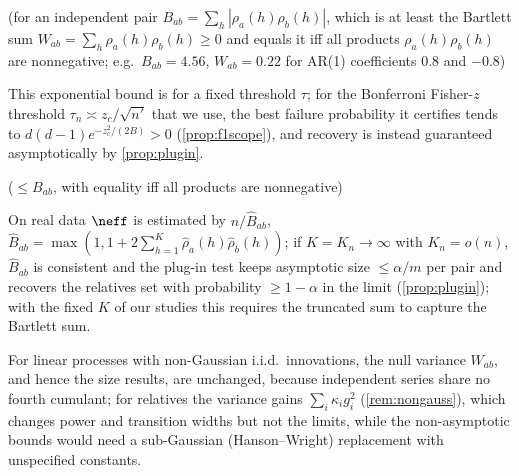 
(for an independent pair $B_{ab}=\sum_h|\rho_a(h)\rho_b(h)|$, which is at least the Bartlett sum
$W_{ab}=\sum_h\rho_a(h)\rho_b(h)\ge0$ and equals it iff all products $\rho_a(h)\rho_b(h)$ are nonnegative; e.g.\
$B_{ab}=4.56$, $W_{ab}=0.22$ for AR(1) coefficients $0.8$ and $-0.8$)

This exponential bound is for a fixed threshold $\tau$; for the Bonferroni Fisher-$z$ threshold
$\tau_n\asymp z_c/\sqrt{n'}$ that we use, the best failure probability it certifies tends to
$d(d{-}1)e^{-z_c^2/(2B)}>0$ (\cref{prop:f1scope}), and recovery is instead guaranteed asymptotically by
\cref{prop:plugin}.

($\le B_{ab}$, with equality iff all products are nonnegative)

On real data $\neff$ is estimated by $n/\hat B_{ab}$,
$\hat B_{ab}=\max(1,1+2\sum_{h=1}^{K}\hat\rho_a(h)\hat\rho_b(h))$; if $K=K_n\to\infty$ with $K_n=o(n)$, $\hat B_{ab}$
is consistent and the plug-in test keeps asymptotic size $\le\alpha/m$ per pair and recovers the relatives set with
probability $\ge1-\alpha$ in the limit (\cref{prop:plugin}); with the fixed $K$ of our studies this requires the
truncated sum to capture the Bartlett sum.

For linear processes with non-Gaussian i.i.d.\ innovations, the null variance $W_{ab}$, and hence the size results,
are unchanged, because independent series share no fourth cumulant; for relatives the variance gains
$\sum_i\kappa_i g_i^2$ (\cref{rem:nongauss}), which changes power and transition widths but not the limits, while the
non-asymptotic bounds would need a sub-Gaussian (Hanson--Wright) replacement with unspecified constants.

